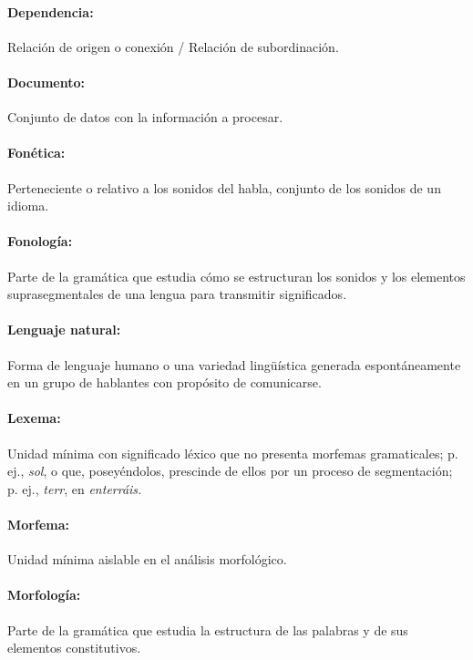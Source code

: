 \documentclass{report}
\begin{document}
\paragraph{Dependencia:}
 Relación de origen o conexión / Relación de subordinación.\autocite{rae.diccionario}

\paragraph{Documento:}
 Conjunto de datos con la información a procesar.\autocite{diapos1}

\paragraph{Fonética:} Perteneciente o relativo a los sonidos del habla, conjunto de los sonidos de un idioma. \autocite{rae.diccionario}

\paragraph{Fonología:} Parte de la gramática que estudia cómo se estructuran los sonidos y los elementos suprasegmentales de una lengua para transmitir significados.\autocite{rae.diccionario}

\paragraph{Lenguaje natural:} Forma de lenguaje humano o una variedad lingüística generada espontáneamente en un grupo de hablantes con propósito de comunicarse.\autocite{wikipedia.es.lenguanatural}

\paragraph{Lexema:} Unidad mínima con significado léxico que no presenta morfemas gramaticales; p. ej., \textit{sol}, o que, poseyéndolos, prescinde de ellos por un proceso de segmentación; p. ej., \textit{terr}, en \textit{enterráis.} \autocite{rae.diccionario}

\paragraph{Morfema:} Unidad mínima aislable en el análisis morfológico. \autocite{rae.diccionario}

\paragraph{Morfología:}Parte de la gramática que estudia la estructura de las palabras y de sus elementos constitutivos. \autocite{rae.diccionario}
\end{document}
